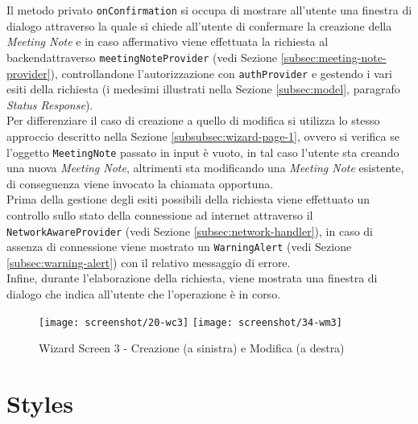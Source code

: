 Il metodo privato \lstinline{onConfirmation} si occupa di mostrare all'utente una finestra di dialogo attraverso la quale si chiede all'utente di confermare la creazione della \emph{Meeting Note} e in caso affermativo viene effettuata la richiesta al \gls{backend}\glsoccur attraverso \lstinline{meetingNoteProvider} (vedi Sezione \ref{subsec:meeting-note-provider}), controllandone l'autorizzazione con \lstinline{authProvider} e gestendo i vari esiti della richiesta (i medesimi illustrati nella Sezione \ref{subsec:model},  paragrafo \emph{Status Response}). \\
Per differenziare il caso di creazione a quello di modifica si utilizza lo stesso approccio descritto nella Sezione \ref{subsubsec:wizard-page-1}, ovvero si verifica se l'oggetto \lstinline{MeetingNote} passato in input è vuoto, in tal caso l'utente sta creando una nuova \emph{Meeting Note}, altrimenti sta modificando una \emph{Meeting Note} esistente, di conseguenza viene invocato la chiamata opportuna. \\
Prima della gestione degli esiti possibili della richiesta viene effettuato un controllo sullo stato della connessione ad internet attraverso il \lstinline{NetworkAwareProvider} (vedi Sezione \ref{subsec:network-handler}), in caso di assenza di connessione viene mostrato un \lstinline{WarningAlert} (vedi Sezione \ref{subsec:warning-alert}) con il relativo messaggio di errore. \\
Infine, durante l'elaborazione della richiesta, viene mostrata una finestra di dialogo che indica all'utente che l'operazione è in corso.

\begin{figure}[!h] 
    \centering 
    \texttt{[image: screenshot/20-wc3]}
    \hfill
    \texttt{[image: screenshot/34-wm3]} 
    \caption{Wizard Screen 3 - Creazione (a sinistra) e Modifica (a destra)}
    \label{fig:w3}
\end{figure}

\newpage

\section{Styles}
\label{sec:styles}


